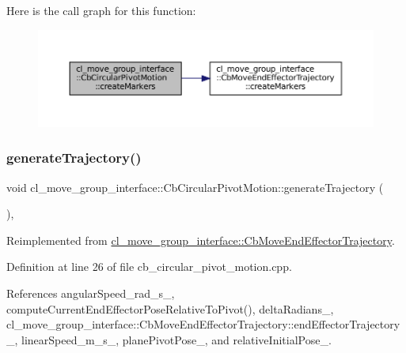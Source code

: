 Here is the call graph for this function\+:
\nopagebreak
\begin{figure}[H]
\begin{center}
\leavevmode
\includegraphics[width=350pt]{classcl__move__group__interface_1_1CbCircularPivotMotion_a48911ad62608cb00c04e979e2f6f644a_cgraph}
\end{center}
\end{figure}
\mbox{\label{classcl__move__group__interface_1_1CbCircularPivotMotion_a8d019ec6b9b26a2af0740b915d441a40}} 
\subsubsection{\texorpdfstring{generate\+Trajectory()}{generateTrajectory()}}
{\footnotesize\ttfamily void cl\+\_\+move\+\_\+group\+\_\+interface\+::\+Cb\+Circular\+Pivot\+Motion\+::generate\+Trajectory (\begin{DoxyParamCaption}{ }\end{DoxyParamCaption})\hspace{0.3cm}{\ttfamily [override]}, {\ttfamily [virtual]}}



Reimplemented from \hyperlink{classcl__move__group__interface_1_1CbMoveEndEffectorTrajectory_aeae938ab66e18ab7d2fb2427bc83647b}{cl\+\_\+move\+\_\+group\+\_\+interface\+::\+Cb\+Move\+End\+Effector\+Trajectory}.



Definition at line 26 of file cb\+\_\+circular\+\_\+pivot\+\_\+motion.\+cpp.



References angular\+Speed\+\_\+rad\+\_\+s\+\_\+, compute\+Current\+End\+Effector\+Pose\+Relative\+To\+Pivot(), delta\+Radians\+\_\+, cl\+\_\+move\+\_\+group\+\_\+interface\+::\+Cb\+Move\+End\+Effector\+Trajectory\+::end\+Effector\+Trajectory\+\_\+, linear\+Speed\+\_\+m\+\_\+s\+\_\+, plane\+Pivot\+Pose\+\_\+, and relative\+Initial\+Pose\+\_\+.


